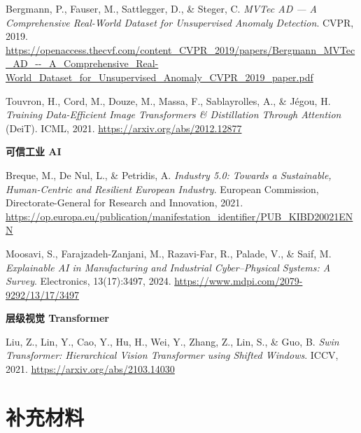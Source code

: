 \documentclass[11pt,a4paper]{article}
\begin{document}
\begin{list}{}{\setlength{\leftmargin}{2.5em}\setlength{\labelwidth}{2em}\setlength{\labelsep}{0.3em}\setlength{\itemsep}{0.2ex}}
\item[19.] Bergmann, P., Fauser, M., Sattlegger, D., \& Steger, C. \emph{MVTec AD — A Comprehensive Real-World Dataset for Unsupervised Anomaly Detection}. CVPR, 2019. \url{https://openaccess.thecvf.com/content_CVPR_2019/papers/Bergmann_MVTec_AD_--_A_Comprehensive_Real-World_Dataset_for_Unsupervised_Anomaly_CVPR_2019_paper.pdf}
\item[20.] Touvron, H., Cord, M., Douze, M., Massa, F., Sablayrolles, A., \& Jégou, H. \emph{Training Data-Efficient Image Transformers \& Distillation Through Attention} (DeiT). ICML, 2021. \url{https://arxiv.org/abs/2012.12877}
\end{list}

\textbf{可信工业 AI}

\begin{list}{}{\setlength{\leftmargin}{2.5em}\setlength{\labelwidth}{2em}\setlength{\labelsep}{0.3em}\setlength{\itemsep}{0.2ex}}
\item[21.] Breque, M., De Nul, L., \& Petridis, A. \emph{Industry 5.0: Towards a Sustainable, Human-Centric and Resilient European Industry}. European Commission, Directorate-General for Research and Innovation, 2021. \url{https://op.europa.eu/publication/manifestation_identifier/PUB_KIBD20021ENN}
\item[22.] Moosavi, S., Farajzadeh-Zanjani, M., Razavi-Far, R., Palade, V., \& Saif, M. \emph{Explainable AI in Manufacturing and Industrial Cyber–Physical Systems: A Survey}. Electronics, 13(17):3497, 2024. \url{https://www.mdpi.com/2079-9292/13/17/3497}
\end{list}

\textbf{层级视觉 Transformer}

\begin{list}{}{\setlength{\leftmargin}{2.5em}\setlength{\labelwidth}{2em}\setlength{\labelsep}{0.3em}\setlength{\itemsep}{0.2ex}}
\item[23.] Liu, Z., Lin, Y., Cao, Y., Hu, H., Wei, Y., Zhang, Z., Lin, S., \& Guo, B. \emph{Swin Transformer: Hierarchical Vision Transformer using Shifted Windows}. ICCV, 2021. \url{https://arxiv.org/abs/2103.14030}
\end{list}


\clearpage
\appendix
{}
\section*{补充材料}
\end{document}
